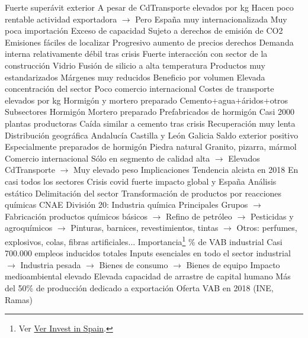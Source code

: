\documentclass{nuevotema}
\begin{document}
\begin{esquemal}
				\4 Fuerte superávit exterior
				\4[] A pesar de CdTransporte elevados por kg
				\4[] Hacen poco rentable actividad exportadora
				\4[] $\to$ Pero España muy internacionalizada
				\4 Muy poca importación
				\4 Exceso de capacidad
				\4 Sujeto a derechos de emisión de CO2
				\4[] Emisiones fáciles de localizar
				\4[] Progresivo aumento de precios derechos
				\4 Demanda interna relativamente débil tras crisis
				\4 Fuerte interacción con sector de la construcción
			\3 Vidrio
				\4 Fusión de silicio a alta temperatura
				\4 Productos muy estandarizados
				\4 Márgenes muy reducidos
				\4 Beneficio por volumen
				\4 Elevada concentración del sector
				\4 Poco comercio internacional
				\4[] Costes de transporte elevados por kg
			\3 Hormigón y mortero preparado
				\4 Cemento+agua+áridos+otros
				\4 Subsectores
				\4[] Hormigón
				\4[] Mortero preparado
				\4[] Prefabricados de hormigón
				\4 Casi 2000 plantas productoras
				\4 Caída similar a cemento tras crisis
				\4 Recuperación muy lenta
				\4 Distribución geográfica
				\4[] Andalucía
				\4[] Castilla y León
				\4[] Galicia
				\4 Saldo exterior positivo
				\4[] Especialmente preparados de hormigón
			\3 Piedra natural
				\4 Granito, pizarra, mármol
				\4 Comercio internacional
				\4[] Sólo en segmento de calidad alta
				\4[] $\to$ Elevados CdTransporte
				\4[] $\to$ Muy elevado peso
			\3 Implicaciones
				\4 Tendencia alcista en 2018
				\4[] En casi todos los sectores
				\4 Crisis covid fuerte impacto global y España
	\1 
		\2 Análisis estático
			\3 Delimitación del sector
				\4[] Transformación de productos por reacciones químicas
				\4[] CNAE División 20: Industria química
				\4[] Principales Grupos
				\4[] $\to$ Fabricación productos químicos básicos
				\4[] $\to$ Refino de petróleo
				\4[] $\to$ Pesticidas y agroquímicos
				\4[] $\to$ Pinturas, barnices, revestimientos, tintas
				\4[] $\to$ Otros: perfumes, explosivos, colas, fibras artificiales...
			\3 Importancia\footnote{Ver \href{https://www.investinspain.org/invest/es/sectores/Industria-Quimica/Descripcion/index.html}{Ver Invest in Spain}.}
				\% de VAB industrial
				\4[] Casi 700.000 empleos inducidos totales
				\4[] Inputs esenciales en todo el sector industrial
				\4[] $\to$ Industria pesada
				\4[] $\to$ Bienes de consumo
				\4[] $\to$ Bienes de equipo
				\4[] Impacto medioambiental elevado
				\4[] Elevada capacidad de arrastre de capital humano
				\4[] Más del 50\% de producción dedicado a exportación
			\3 Oferta
				 VAB en 2018 (INE, Ramas)

\end{esquemal}
\end{document}

